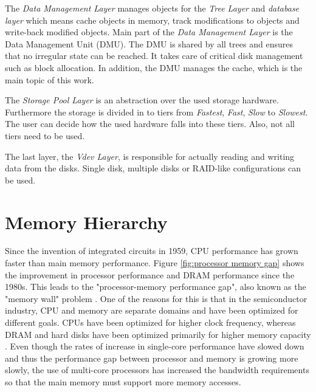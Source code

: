 \documentclass[
	12pt,
	a4paper,
	abstract,
	bibliography=totoc,
	chapterprefix,
	headings=openright,
	numbers=endperiod,
	parskip=half,
	twoside,
]{scrreprt}
\begin{document}
The \emph{Data Management Layer} manages objects for the \emph{Tree Layer} and \emph{database layer} which means cache objects in memory, 
track modifications to objects and write-back modified objects.
Main part of the \emph{Data Management Layer} is the Data Management Unit (DMU).
The DMU is shared by all trees and ensures that no irregular state can be reached.
It takes care of critical disk management such as block allocation.
In addition, the DMU manages the cache, which is the main topic of this work.

The \emph{Storage Pool Layer} is an abstraction over the used storage hardware.
Furthermore the storage is divided in to tiers from \emph{Fastest}, \emph{Fast}, \emph{Slow} to \emph{Slowest}.
The user can decide how the used hardware falls into these tiers. Also, not all tiers need to be used.

The last layer, the \emph{Vdev Layer}, is responsible for actually reading and writing data from the disks.
Single disk, multiple disks or RAID-like configurations can be used.

\section{Memory Hierarchy}
Since the invention of integrated circuits in 1959, CPU performance has grown faster than main memory performance.
Figure \ref{fig:processor memory gap} shows the improvement in processor performance and DRAM performance since the 1980s.
This leads to the "processor-memory performance gap", also known as the "memory wall" problem \cite{wulf1995hitting}.
One of the reasons for this is that in the semiconductor industry, CPU and memory are separate domains and have been optimized for different goals.
CPUs have been optimized for higher clock frequency, whereas DRAM and hard disks have been optimized primarily for higher memory capacity \cite{cpu-mem-gap}.
Even though the rates of increase in single-core performance have slowed down and thus the performance gap between processor and memory is growing more slowly, the use of multi-core processors has increased the bandwidth requirements so that the main memory must support more memory accesses.
\end{document}

